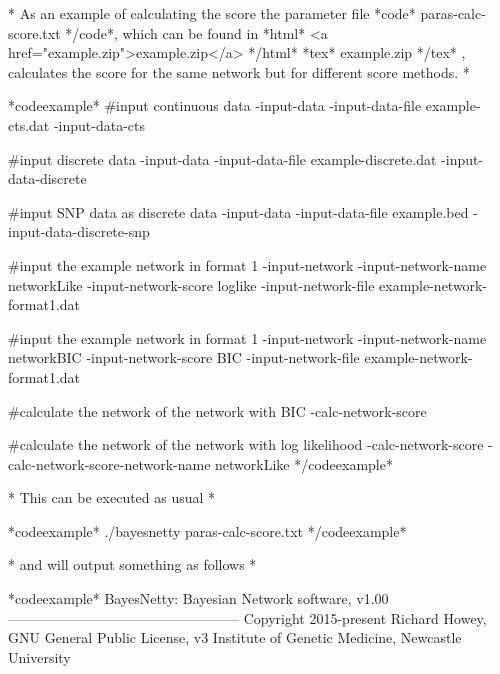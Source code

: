* As an example of calculating the score the parameter file *code* paras-calc-score.txt */code*, which can be found in *html* <a href="example.zip">example.zip</a> */html* *tex* example.zip */tex* , calculates the score for the same network but for different score methods. *

*codeexample* #input continuous data -input-data -input-data-file example-cts.dat -input-data-cts

#input discrete data -input-data -input-data-file example-discrete.dat -input-data-discrete

#input SNP data as discrete data -input-data -input-data-file example.bed -input-data-discrete-snp

#input the example network in format 1 -input-network -input-network-name networkLike -input-network-score loglike -input-network-file example-network-format1.dat

#input the example network in format 1 -input-network -input-network-name networkBIC -input-network-score BIC -input-network-file example-network-format1.dat

#calculate the network of the network with BIC -calc-network-score

#calculate the network of the network with log likelihood -calc-network-score -calc-network-score-network-name networkLike */codeexample*

* This can be executed as usual *

*codeexample* ./bayesnetty paras-calc-score.txt */codeexample*

* and will output something as follows *

*codeexample* BayesNetty: Bayesian Network software, v1.00 -------------------------------------------------- Copyright 2015-present Richard Howey, GNU General Public License, v3 Institute of Genetic Medicine, Newcastle University


